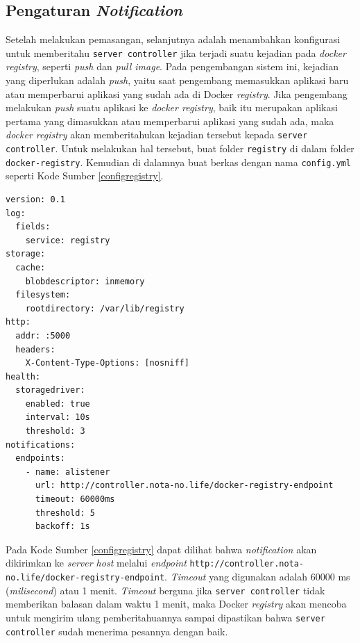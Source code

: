         \subsection{Pengaturan \textit{Notification}}
        	Setelah melakukan pemasangan, selanjutnya adalah menambahkan konfigurasi untuk memberitahu \texttt{server controller} jika terjadi suatu kejadian pada \textit{docker registry}, seperti \textit{push} dan \textit{pull image}. Pada pengembangan sistem ini, kejadian yang diperlukan adalah \textit{push}, yaitu saat pengembang memasukkan aplikasi baru atau memperbarui aplikasi yang sudah ada di Docker \textit{registry}. Jika pengembang melakukan \textit{push} suatu aplikasi ke \textit{docker registry}, baik itu merupakan aplikasi pertama yang dimasukkan atau memperbarui aplikasi yang sudah ada, maka \textit{docker registry} akan memberitahukan kejadian tersebut kepada \texttt{server controller}. Untuk melakukan hal tersebut, buat folder \texttt{registry} di dalam folder \texttt{docker-registry}. Kemudian di dalamnya buat berkas dengan nama \texttt{config.yml} seperti Kode Sumber \ref{configregistry}.
    \begin{lstlisting}[frame=single,tabsize=2,breaklines,caption={Isi config.yml},label=configregistry, captionpos=b]
version: 0.1
log:
  fields:
    service: registry
storage:
  cache:
    blobdescriptor: inmemory
  filesystem:
    rootdirectory: /var/lib/registry
http:
  addr: :5000
  headers:
    X-Content-Type-Options: [nosniff]
health:
  storagedriver:
    enabled: true
    interval: 10s
    threshold: 3
notifications:
  endpoints:
    - name: alistener
      url: http://controller.nota-no.life/docker-registry-endpoint
      timeout: 60000ms
      threshold: 5
      backoff: 1s       
	\end{lstlisting}
            \indent Pada Kode Sumber \ref{configregistry} dapat dilihat bahwa \textit{notification} akan dikirimkan ke \textit{server host} melalui \textit{endpoint} \texttt{http://controller.nota-no.life/docker-registry-endpoint}. \textit{Timeout} yang digunakan adalah 60000 ms (\textit{milisecond}) atau 1 menit. \textit{Timeout} berguna jika \texttt{server controller} tidak memberikan balasan dalam waktu 1 menit, maka Docker \textit{registry} akan mencoba untuk mengirim ulang pemberitahuannya sampai dipastikan bahwa \texttt{server controller} sudah menerima pesannya dengan baik.
            
